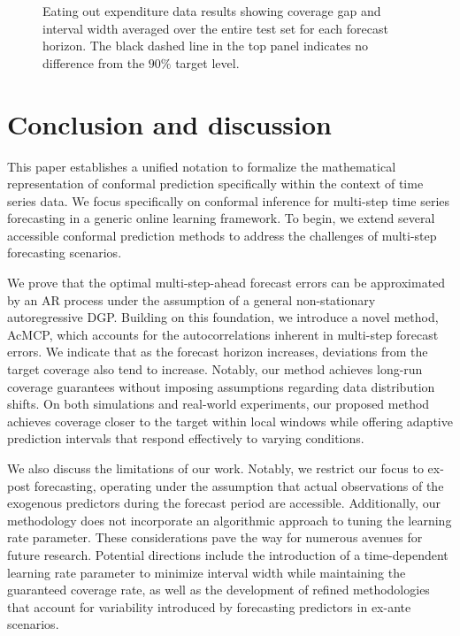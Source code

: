 \documentclass[
  11pt,
  a4paper,
]{article}
\theoremstyle{plain}
\theoremstyle{remark}
\begin{document}
\begin{figure}


\caption{\label{fig-cafe_cov}Eating out expenditure data results showing
coverage gap and interval width averaged over the entire test set for
each forecast horizon. The black dashed line in the top panel indicates
no difference from the \(90\%\) target level.}

\end{figure}%

\section{Conclusion and discussion}\label{conclusion-and-discussion}

This paper establishes a unified notation to formalize the mathematical
representation of conformal prediction specifically within the context
of time series data. We focus specifically on conformal inference for
multi-step time series forecasting in a generic online learning
framework. To begin, we extend several accessible conformal prediction
methods to address the challenges of multi-step forecasting scenarios.

We prove that the optimal multi-step-ahead forecast errors can be
approximated by an AR process under the assumption of a general
non-stationary autoregressive DGP. Building on this foundation, we
introduce a novel method, AcMCP, which accounts for the autocorrelations
inherent in multi-step forecast errors. We indicate that as the forecast
horizon increases, deviations from the target coverage also tend to
increase. Notably, our method achieves long-run coverage guarantees
without imposing assumptions regarding data distribution shifts. On both
simulations and real-world experiments, our proposed method achieves
coverage closer to the target within local windows while offering
adaptive prediction intervals that respond effectively to varying
conditions.

We also discuss the limitations of our work. Notably, we restrict our
focus to ex-post forecasting, operating under the assumption that actual
observations of the exogenous predictors during the forecast period are
accessible. Additionally, our methodology does not incorporate an
algorithmic approach to tuning the learning rate parameter. These
considerations pave the way for numerous avenues for future research.
Potential directions include the introduction of a time-dependent
learning rate parameter to minimize interval width while maintaining the
guaranteed coverage rate, as well as the development of refined
methodologies that account for variability introduced by forecasting
predictors in ex-ante scenarios.
\end{document}
